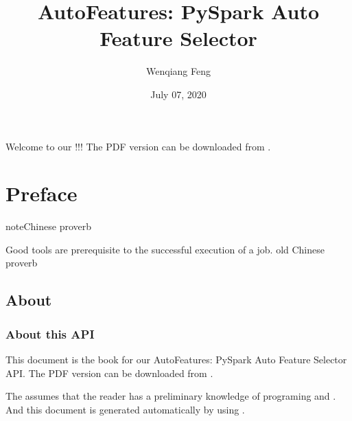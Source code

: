 \documentclass[letterpaper,11pt,english]{sphinxmanual}
\title{AutoFeatures: PySpark Auto Feature Selector}
\date{July 07, 2020}
\author{Wenqiang Feng}
\begin{document}
\pagestyle{empty}
\sphinxmaketitle
\pagestyle{plain}
\sphinxtableofcontents
\pagestyle{normal}
\label{\detokenize{index::doc}}\begin{quote}
\end{quote}

Welcome to our !!! The PDF version
can be downloaded from .




\chapter{Preface}
\label{\detokenize{preface:preface}}\label{\detokenize{preface:id1}}\label{\detokenize{preface::doc}}
\begin{sphinxadmonition}{note}{Chinese proverb}

Good tools are prerequisite to the successful execution of a job. \textendash{} old Chinese proverb
\end{sphinxadmonition}


\section{About}
\label{\detokenize{preface:about}}

\subsection{About this API}
\label{\detokenize{preface:about-this-api}}
This document is the  book for our AutoFeatures: PySpark Auto Feature Selector  API.
The PDF version can be downloaded from . 

The  assumes that the reader has a preliminary knowledge of  programing and . And this
document is generated automatically by using .
\end{document}
